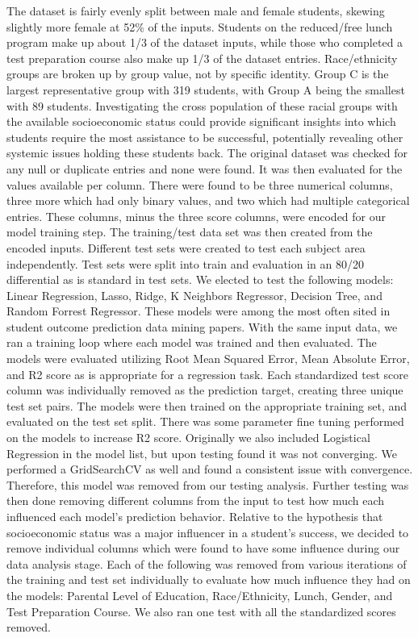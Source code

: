 \documentclass[doc]{apa6} %
\begin{document}
The dataset is fairly evenly split between male and female students, skewing slightly more female at 52\% of the inputs. Students on the reduced/free lunch program make up about 1/3 of the dataset inputs, while those who completed a test preparation course also make up 1/3 of the dataset entries. Race/ethnicity groups are broken up by group value, not by specific identity. Group C is the largest representative group with 319 students, with Group A being the smallest with 89 students. Investigating the cross population of these racial groups with the available socioeconomic status could provide significant insights into which students require the most assistance to be successful, potentially revealing other systemic issues holding these students back.
The original dataset was checked for any null or duplicate entries and none were found. It was then evaluated for the values available per column. There were found to be three numerical columns, three more which had only binary values, and two which had multiple categorical entries. These columns, minus the three score columns, were encoded for our model training step.
The training/test data set was then created from the encoded inputs. Different test sets were created to test each subject area independently. Test sets were split into train and evaluation in an 80/20 differential as is standard in test sets. \cite{ParetoSplit}
We elected to test the following models: Linear Regression, Lasso, Ridge, K Neighbors Regressor, Decision Tree, and Random Forrest Regressor. These models were among the most often sited in student outcome prediction data mining papers. \cite{MLMoodle} \cite{dataMineLit} With the same input data, we ran a training loop where each model was trained and then evaluated. The models were evaluated utilizing Root Mean Squared Error, Mean Absolute Error, and R2 score as is appropriate for a regression task. \cite{measuremetrics}
Each standardized test score column was individually removed as the prediction target, creating three unique test set pairs. The models were then trained on the appropriate training set, and evaluated on the test set split. There was some parameter fine tuning performed on the models to increase R2 score.  Originally we also included Logistical Regression in the model list, but upon testing found it was not converging. We performed a GridSearchCV as well and found a consistent issue with convergence. Therefore, this model was removed from our testing analysis.
Further testing was then done removing different columns from the input to test how much each influenced each model's prediction behavior. Relative to the hypothesis that socioeconomic status was a major influencer in a student's success, we decided to remove individual columns which were found to have some influence during our data analysis stage. Each of the following was removed from various iterations of the training and test set individually to evaluate how much influence they had on the models: Parental Level of Education, Race/Ethnicity, Lunch, Gender, and Test Preparation Course. We also ran one test with all the standardized scores removed.
\end{document}
